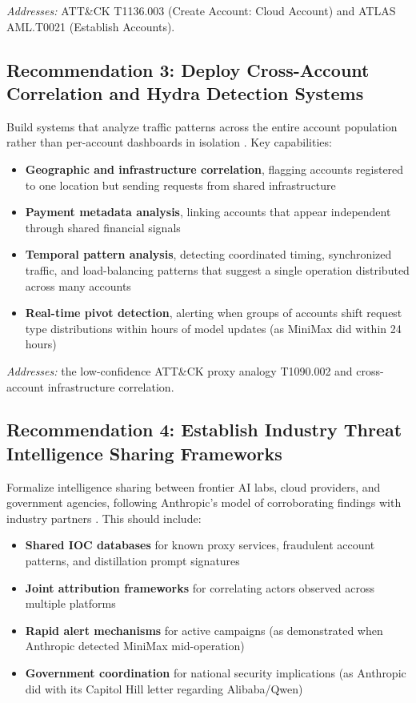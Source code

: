 \documentclass[11pt,a4paper]{article}
\begin{document}
\noindent\textit{Addresses:} ATT\&CK T1136.003 (Create Account: Cloud Account) and ATLAS AML.T0021 (Establish Accounts).

\subsection{Recommendation 3: Deploy Cross-Account Correlation and Hydra Detection Systems}

Build systems that analyze traffic patterns across the entire account population rather than per-account dashboards in isolation \cite{treblle}. Key capabilities:

\begin{itemize}[leftmargin=20pt, noitemsep]
    \item \textbf{Geographic and infrastructure correlation}, flagging accounts registered to one location but sending requests from shared infrastructure
    \item \textbf{Payment metadata analysis}, linking accounts that appear independent through shared financial signals
    \item \textbf{Temporal pattern analysis}, detecting coordinated timing, synchronized traffic, and load-balancing patterns that suggest a single operation distributed across many accounts
    \item \textbf{Real-time pivot detection}, alerting when groups of accounts shift request type distributions within hours of model updates (as MiniMax did within 24 hours)
\end{itemize}

\noindent\textit{Addresses:} the low-confidence ATT\&CK proxy analogy T1090.002 and cross-account infrastructure correlation.

\subsection{Recommendation 4: Establish Industry Threat Intelligence Sharing Frameworks}

Formalize intelligence sharing between frontier AI labs, cloud providers, and government agencies, following Anthropic's model of corroborating findings with industry partners \cite{anthropic_blog}. This should include:

\begin{itemize}[leftmargin=20pt, noitemsep]
    \item \textbf{Shared IOC databases} for known proxy services, fraudulent account patterns, and distillation prompt signatures
    \item \textbf{Joint attribution frameworks} for correlating actors observed across multiple platforms
    \item \textbf{Rapid alert mechanisms} for active campaigns (as demonstrated when Anthropic detected MiniMax mid-operation)
    \item \textbf{Government coordination} for national security implications (as Anthropic did with its Capitol Hill letter regarding Alibaba/Qwen) \cite{reuters_alibaba}\cite{forbes_distillation}
\end{itemize}
\end{document}
